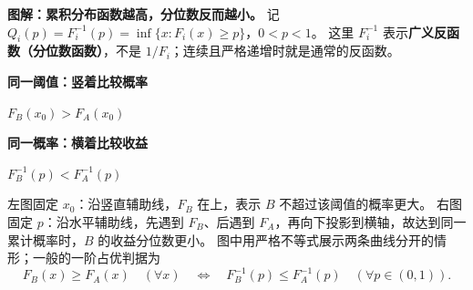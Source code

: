 \par\medskip\noindent\begin{minipage}{\linewidth}
%
\textbf{图解：累积分布函数越高，分位数反而越小。}
记 $Q_i(p)=F_i^{-1}(p)=\inf\{x:F_i(x)\ge p\}$，$0<p<1$。
这里 $F_i^{-1}$ 表示\textbf{广义反函数（分位数函数）}，不是 $1/F_i$；连续且严格递增时就是通常的反函数。

\begin{center}
\begin{minipage}{\linewidth}
\centering
\begin{minipage}[t]{0.49\linewidth}
\centering
\textbf{同一阈值：竖着比较概率}\\[3pt]
\par\smallskip
$F_B(x_0)>F_A(x_0)$
\end{minipage}\hfill
\begin{minipage}[t]{0.49\linewidth}
\centering
\textbf{同一概率：横着比较收益}\\[3pt]
\par\smallskip
$F_B^{-1}(p)<F_A^{-1}(p)$
\end{minipage}
\end{minipage}
\end{center}
\end{minipage}\par\medskip

左图固定 $x_0$：沿竖直辅助线，$F_B$ 在上，表示 $B$ 不超过该阈值的概率更大。
右图固定 $p$：沿水平辅助线，先遇到 $F_B$、后遇到 $F_A$，再向下投影到横轴，故达到同一累计概率时，$B$ 的收益分位数更小。
图中用严格不等式展示两条曲线分开的情形；一般的一阶占优判据为
\[
 F_B(x)\ge F_A(x)\quad(\forall x)
 \quad\Longleftrightarrow\quad
 F_B^{-1}(p)\le F_A^{-1}(p)\quad(\forall p\in(0,1)).
\]

